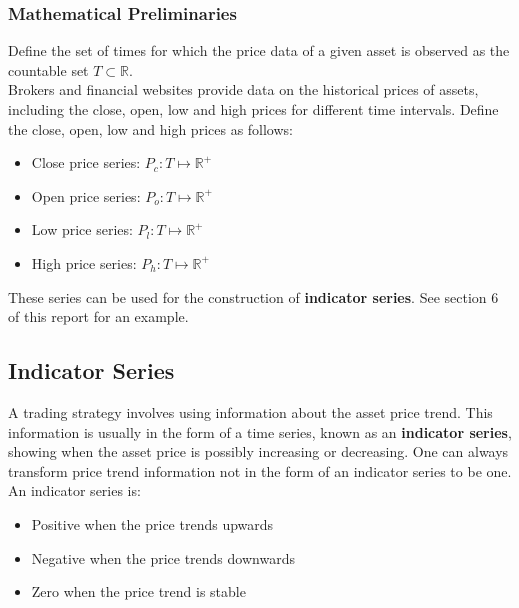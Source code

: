 \documentclass[11pt]{article}
\begin{document}
\subsubsection{Mathematical Preliminaries}

Define the set of times for which the price data of a given asset is observed as the countable set $T \subset \mathbb{R}$.\\

Brokers and financial websites provide data on the historical prices of assets, including the close, open, low and high prices for different time intervals.
Define the close, open, low and high prices as follows:
\begin{itemize}
    \item Close price series: $P_{c}:T \mapsto \mathbb{R^{+}}$
    \item Open price series: $P_{o}:T \mapsto \mathbb{R^{+}}$
    \item Low price series: $P_{l}:T \mapsto \mathbb{R^{+}}$
    \item High price series: $P_{h}:T \mapsto \mathbb{R^{+}}$
\end{itemize}

These series can be used for the construction of \textbf{indicator series}. See section 6 of this report for an example.

\subsection{Indicator Series}

A trading strategy involves using information about the asset price trend.
This information is usually in the form of a time series, known as an \textbf{indicator series}, showing when the asset price is possibly increasing or decreasing. One can always transform price trend information not in the form of an indicator series to be one.\\

An indicator series is:
\begin{itemize}
    \item Positive when the price trends upwards
    \item Negative when the price trends downwards
    \item Zero when the price trend is stable
\end{itemize}
\end{document}
